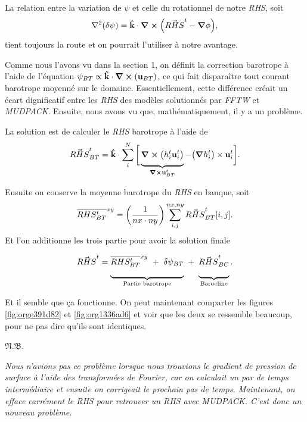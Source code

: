 \documentclass[10pt]{article}
\numberwithin{equation}{section}
\newcommand{\kvf}{\vb{\hat{k}}}
\newcommand{\uu}{\vb{u}}
\newcommand{\grande}{\vphantom{\frac{1}{xx}}}
\newcommand{\venti}{\vphantom{\sum_x^x}}
\newcommand{\pt}{\hspace{1pt}} %
\newcommand{\xymean}[1]{\overline{#1}^{xy}}
\newcommand{\nb}{\underline{{\footnotesize\EightStarConvex}\pt $\mathfrak{N.B.}$\vphantom{p}}\hspace{3pt}}
\begin{document}
La relation entre la variation de \(\psi\) et celle du rotationnel de notre \emph{RHS}, soit
\begin{equation}
   \laplacian(\delta \psi) = \kvf\cdot\curl(\vec{RHS}^t - \gradient{\phi}),
\end{equation}
tient toujours la route et on pourrait l'utiliser à notre avantage.\bigskip

Comme nous l'avons vu dans la section 1, on définit la correction barotrope à l'aide de l'équation \(\psi_{BT} \propto \kvf\cdot\curl(\uu_{BT})\), ce qui fait disparaître tout courant barotrope moyenné sur le domaine.
Essentiellement, cette différence créait un écart dignificatif entre les \emph{RHS} des modèles solutionnés par \emph{FFTW} et \emph{MUDPACK}.
Ensuite, nous avons vu que, mathématiquement, il y a un problème.\bigskip

La solution est de calculer le \emph{RHS} barotrope à l'aide de
\begin{equation}
   \vec{RHS}^t_{BT} = \kvf\cdot \sum_i^N \bigg[ \underbrace{\grande\curl(h^t_i \uu^t_i)}_{\curl{\uu^t_{BT}}}  - \qty(\gradient{h^t_i})\times\uu^t_i\bigg].
\end{equation}

Ensuite on conserve la moyenne barotrope du \emph{RHS} en banque, soit
\begin{equation}
   \xymean{RHS^t_{BT}} = \qty(\frac{1}{nx\cdot ny})\sum_{i,j}^{nx,ny} \vec{RHS}^t_{BT}[i,j].
\end{equation}
Et l'on additionne les trois partie pour avoir la solution finale
\begin{equation}
   \vec{RHS}^t = \underbrace{\venti\xymean{RHS^t_{BT}} \ + \ \delta \psi_{BT}}_\text{Partie barotrope}\ + \ \underbrace{\venti\vec{RHS}^t_{BC}}_\text{Barocline}.
\end{equation}

Et il semble que ça fonctionne.
On peut maintenant comparter les figures \ref{fig:orge391d82} et \ref{fig:org1336ad6} et voir que les deux se ressemble beaucoup, pour ne pas dire qu'ils sont identiques. \bigskip

\nb\begin{minipage}[t]{0.9\linewidth}
\itshape Nous n'avions pas ce problème lorsque nous trouvions le gradient de pression de surface à l'aide des transformées de Fourier, car on calculait un par de temps intermédiaire et ensuite on corrigeait le prochain pas de temps. Maintenant, on efface carrément le RHS pour retrouver un RHS avec MUDPACK. C'est donc un nouveau problème.
\end{minipage}
\end{document}
